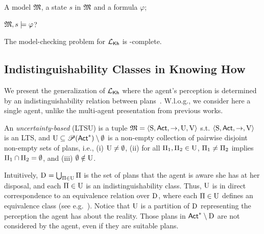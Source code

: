 \begin{description} \itemsep 0cm
    \item[Input:] A model ${\mathfrak{M}}$, a state $s$ in ${\mathfrak{M}}$ and a formula $\varphi$;
    \item[Output:] ${\mathfrak{M}},s\models\varphi$?
\end{description}

\begin{proposition}[\cite{DF23}]
    The model-checking problem for ${\mathcal{L}_{{\mathsf{Kh}}}}$ is \PSPACE-complete.
\end{proposition}

\subsection{Indistinguishability Classes in Knowing How}

We present the generalization of ${\mathcal{L}_{{\mathsf{Kh}}}}$ where the agent's perception is determined by an indistinguishability relation between plans~\cite{AFSVQ21,AFSVQ23}. W.l.o.g., we consider here a single agent, unlike the multi-agent presentation from previous works.

\begin{definition}\label{def:ults}
An \emph{uncertainty-based \lts} (LTSU) is a tuple     ${\mathfrak{M}}=\langle{\operatorname{S},{\rm \sf Act},\rightarrow,\operatorname{U},\operatorname{V}}\rangle$ s.t. $\langle{\operatorname{S},{\rm \sf Act},\rightarrow,\operatorname{V}}\rangle$ is an LTS, and 
$\operatorname{U}\subseteq \mathscr{P}({\rm \sf Act}^*)\setminus \emptyset$ is a non-empty collection of pairwise disjoint non-empty sets of plans, i.e., (i) $\operatorname{U}\neq\emptyset$, (ii) for all $\Pi_1,\Pi_2\in\operatorname{U}$, $\Pi_1\neq\Pi_2$ implies  $\Pi_1\cap\Pi_2=\emptyset$, and (iii) $\emptyset\notin\operatorname{U}$. 

\end{definition}

Intuitively, $\operatorname{D}_{} = \bigcup_{\Pi \in \operatorname{U}} \Pi$ is the set of plans that the  agent is aware she has at her disposal, and each $\Pi \in \operatorname{U}$ is an indistinguishability class. Thus, $\operatorname{U}$ is in direct correspondence to an equivalence relation over $\operatorname{D}_{}$, where each $\Pi\in\operatorname{U}$ defines an equivalence class (see e.g.~\cite{AFSVQ23}). 
%
Notice that $\operatorname{U}$ is a partition of $\operatorname{D}_{}$ representing the perception the agent has about the reality.  Those plans in ${\rm \sf Act}^*\setminus\operatorname{D}_{}$ are not considered by the agent, even if they are suitable plans. 

